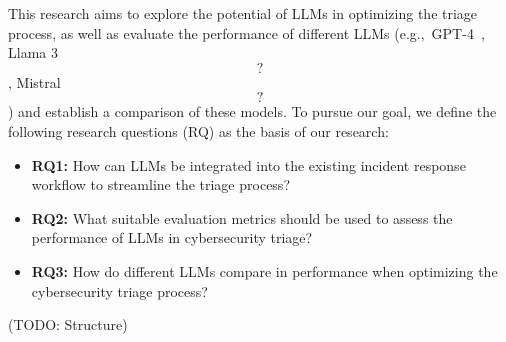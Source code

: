 
This research aims to explore the potential of LLMs in optimizing the triage process, as well as evaluate the
performance of different LLMs (e.g.,\ GPT-4\ \citep{achiam2023gpt}, Llama 3\ \[?\], Mistral\ \[?\]) and establish a
comparison of these models.
To pursue our goal, we define the following research questions (RQ) as the basis of our research:

\begin{itemize}
    \item \textbf{RQ1:} How can LLMs be integrated into the existing incident response workflow to streamline the triage process?
    \item \textbf{RQ2:} What suitable evaluation metrics should be used to assess the performance of LLMs in cybersecurity triage?
    \item \textbf{RQ3:} How do different LLMs compare in performance when optimizing the cybersecurity triage process?
\end{itemize}

(TODO: Structure) %
